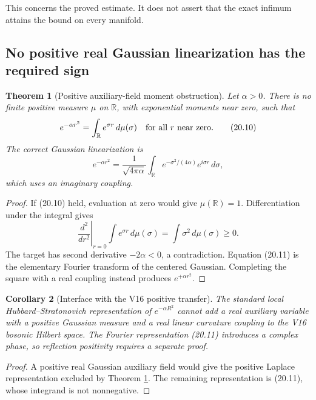 \documentclass[11pt]{article}
\newtheorem{theorem}{Theorem}[section]
\newtheorem{corollary}[theorem]{Corollary}
\theoremstyle{remark}
\begin{document}
This concerns the proved estimate.  It does not assert that the exact
infimum attains the bound on every manifold.

\subsection{No positive real Gaussian linearization has the required sign}

\begin{theorem}[Positive auxiliary-field moment obstruction]
\label{thm:v19v17-auxiliary}
Let \(\alpha>0\).  There is no finite positive measure \(\mu\) on
\(\mathbb R\), with exponential moments near zero, such that
\[
 e^{-\alpha r^2}=\int_{\mathbb R}e^{\sigma r}\,d\mu(\sigma)
 \quad\hbox{for all \(r\) near zero}.                          \tag{20.10}
\]
The correct Gaussian linearization is
\[
 e^{-\alpha r^2}
 =
 \frac1{\sqrt{4\pi\alpha}}
 \int_{\mathbb R}
 e^{-\sigma^2/(4\alpha)}e^{i\sigma r}\,d\sigma,                \tag{20.11}
\]
which uses an imaginary coupling.
\end{theorem}

\begin{proof}
If (20.10) held, evaluation at zero would give \(\mu(\mathbb R)=1\).
Differentiation under the integral gives
\[
 \left.\frac{d^2}{dr^2}\right|_{r=0}
 \int e^{\sigma r}\,d\mu(\sigma)
 =\int\sigma^2\,d\mu(\sigma)\geq0.                             \tag{20.12}
\]
The target has second derivative \(-2\alpha<0\), a contradiction.
Equation (20.11) is the elementary Fourier transform of the centered
Gaussian.  Completing the square with a real coupling instead produces
\(e^{+\alpha r^2}\).
\end{proof}

\begin{corollary}[Interface with the V16 positive transfer]
\label{cor:v19v17-transfer}
The standard local Hubbard--Stratonovich representation of
\(e^{-\alpha R^2}\) cannot add a real auxiliary variable with a positive
Gaussian measure and a real linear curvature coupling to the V16 bosonic
Hilbert space.  The Fourier representation (20.11) introduces a complex
phase, so reflection positivity requires a separate proof.
\end{corollary}

\begin{proof}
A positive real Gaussian auxiliary field would give the positive Laplace
representation excluded by Theorem \ref{thm:v19v17-auxiliary}.  The
remaining representation is (20.11), whose integrand is not nonnegative.
\end{proof}
\end{document}
